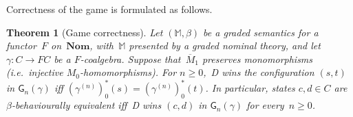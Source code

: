 \documentclass[11pt,a4paper]{amsart}
\newtheorem{theorem}{Theorem}[section]
\newtheorem{corollary}[corollary]{Corollary}
\newtheorem{remark}[remark]{Remark}
\newcommand{\Perm}{\mathsf{Perm}(\Names)}
\newcommand{\game}{\mathsf{G}}
\newcommand{\Names}{\mathbb{A}}
\newcommand{\mbar}{\overline{M}_1}
\theoremstyle{plain}
\numberwithin{equation}{section}
\newcommand{\monad}{{\mathbb{M}}}
\newcommand{\+}[1]{\mathcal{#1}\xspace}
\newcommand{\Nom}{\mathbf{Nom}}
\theoremstyle{definition}
\begin{document}
Correctness of the game is formulated as follows.
\begin{theorem}[Game correctness] \label{thm:games} Let
  $(\monad,\beta)$ be a graded semantics for a functor~$F$ on~$\Nom$,
  with~$\monad$ presented by a graded nominal theory, and let
  $\gamma\colon C\to FC$ be a $F$-coalgebra. Suppose that~$\mbar$
  preserves monomorphisms (i.e.~injective $M_0$-homomorphisms). For
  $n\ge 0$,~D wins the configuration $(s,t)$ in $\game_n(\gamma)$ iff
  $(\gamma^{(n)})^*_0(s)=(\gamma^{(n)})^*_0(t)$.
  In particular, states $c,d\in C$ are $\beta$-behaviourally
  equivalent iff~D wins $(c,d)$ in $\game_n(\gamma)$ for
  every~$n\ge 0$.
\end{theorem}
\end{document}
